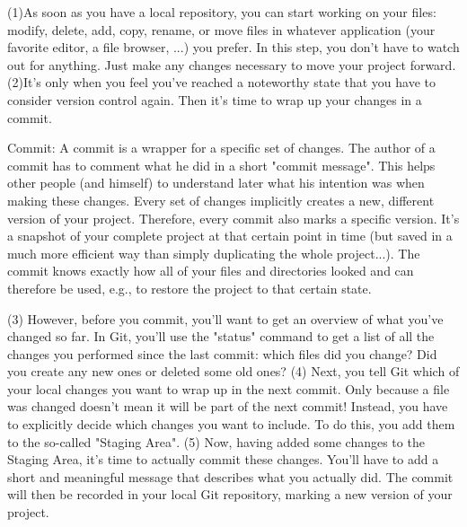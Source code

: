 \documentclass{article}
\begin{document}
(1)As soon as you have a local repository, you can start working on your files: modify, delete, add, copy, rename, or move files in whatever application (your favorite editor, a file browser, ...) you prefer. In this step, you don't have to watch out for anything. Just make any changes necessary to move your project forward.
\newline\newline
(2)It's only when you feel you've reached a noteworthy state that you have to consider version control again. Then it's time to wrap up your changes in a commit.
\begin{definition}Commit:
\newline\newline
A commit is a wrapper for a specific set of changes. The author of a commit has to comment what he did in a short "commit message". This helps other people (and himself) to understand later what his intention was when making these changes.
\newline\newline
Every set of changes implicitly creates a new, different version of your project. Therefore, every commit also marks a specific version. It's a snapshot of your complete project at that certain point in time (but saved in a much more efficient way than simply duplicating the whole project...). The commit knows exactly how all of your files and directories looked and can therefore be used, e.g., to restore the project to that certain state.
\end{definition}
(3) However, before you commit, you'll want to get an overview of what you've changed so far. In Git, you'll use the "status" command to get a list of all the changes you performed since the last commit: which files did you change? Did you create any new ones or deleted some old ones?
\newline\newline
(4) Next, you tell Git which of your local changes you want to wrap up in the next commit. Only because a file was changed doesn't mean it will be part of the next commit! Instead, you have to explicitly decide which changes you want to include. To do this, you add them to the so-called "Staging Area".
\newline\newline
(5) Now, having added some changes to the Staging Area, it's time to actually commit these changes. You'll have to add a short and meaningful message that describes what you actually did. The commit will then be recorded in your local Git repository, marking a new version of your project.
\end{document}
